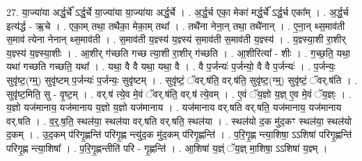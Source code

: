 \documentclass[17pt]{extarticle}
\begin{document}
27. या॒ज्या॑या अर्द्ध॒र्चे᳚ ऽर्द्ध॒र्चे या॒ज्या॑या या॒ज्या॑या अर्द्ध॒र्चे । . अ॒र्द्ध॒र्च एका॒ मेका॑ मर्द्ध॒र्चे᳚ ऽर्द्ध॒र्च एका᳚म् । . अ॒र्द्ध॒र्च इत्य॑र्द्ध - ऋ॒चे । . एका॒म् तथा॒ तथैका॒ मेका॒म् तथा᳚ । . तथै॑ना नेना॒न् तथा॒ तथै॑नान् । . ए॒ना॒न् थ्स॒माव॑ती स॒माव॑ त्येना नेनान् थ्स॒माव॑ती । . स॒माव॑ती य॒ज्ञ्स्य॑ य॒ज्ञ्स्य॑ स॒माव॑ती स॒माव॑ती य॒ज्ञ्स्य॑ । . य॒ज्ञ्स्या॒शी रा॒शीर् य॒ज्ञ्स्य॑ य॒ज्ञ्स्या॒शीः । . आ॒शीर् ग॑च्छति गच्छ त्या॒शी रा॒शीर् ग॑च्छति । . आ॒शीरित्या᳚ - शीः । . ग॒च्छ॒ति॒ यथा॒ यथा॑ गच्छति गच्छति॒ यथा᳚ । . यथा॒ वै वै यथा॒ यथा॒ वै । . वै प॒र्जन्यः॑ प॒र्जन्यो॒ वै वै प॒र्जन्यः॑ । . प॒र्जन्यः॒ सुवृ॑ष्ट॒(ग्म्॒) सुवृ॑ष्टम् प॒र्जन्यः॑ प॒र्जन्यः॒ सुवृ॑ष्टम् । . सुवृ॑ष्टं॒ ॅवर्.ष॑ति॒ वर्.ष॑ति॒ सुवृ॑ष्ट॒(ग्म्॒) सुवृ॑ष्टं॒ ॅवर्.ष॑ति । . सुवृ॑ष्ट॒मिति॒ सु - वृ॒ष्ट॒म् । . वर्.ष॑ त्ये॒व मे॒वं ॅवर्.ष॑ति॒ वर्.ष॑ त्ये॒वम् । . ए॒वं ॅय॒ज्ञो य॒ज्ञ् ए॒व मे॒वं ॅय॒ज्ञ्ः । . य॒ज्ञो यज॑मानाय॒ यज॑मानाय य॒ज्ञो य॒ज्ञो यज॑मानाय । . यज॑मानाय वर्.षति वर्.षति॒ यज॑मानाय॒ यज॑मानाय वर्.षति । . व॒र्॒.ष॒ति॒ स्थल॑या॒ स्थल॑या वर्.षति वर्.षति॒ स्थल॑या । . स्थल॑यो द॒क मु॑द॒कꣳ स्थल॑या॒ स्थल॑यो द॒कम् । . उ॒द॒कम् प॑रिगृ॒ह्णन्ति॑ परिगृ॒ह्ण न्त्यु॑द॒क मु॑द॒कम् प॑रिगृ॒ह्णन्ति॑ । . प॒रि॒गृ॒ह्ण न्त्या॒शिषा॒ ऽऽशिषा॑ परिगृ॒ह्णन्ति॑ परिगृ॒ह्ण न्त्या॒शिषा᳚ । . प॒रि॒गृ॒ह्णन्तीति॑ परि - गृ॒ह्णन्ति॑ । . आ॒शिषा॑ य॒ज्ञ्ं ॅय॒ज्ञ् मा॒शिषा॒ ऽऽशिषा॑ य॒ज्ञ्म् । \newline
\end{document}
